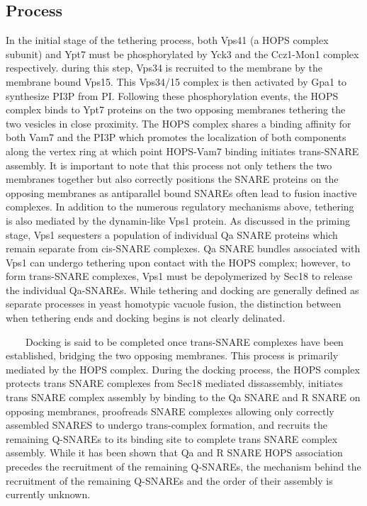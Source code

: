 \documentclass[12pt,twoside]{reedthesis}
\begin{document}
\subsection{Process}\label{process-1}

In the initial stage of the tethering process, both Vps41 (a HOPS complex subunit) and Ypt7 must be phosphorylated by Yck3 and the Ccz1-Mon1 complex respectively. during this step, Vps34 is recruited to the membrane by the membrane bound Vps15. This Vps34/15 complex is then activated by Gpa1 to synthesize PI3P from PI. Following these phosphorylation events, the HOPS complex binds to Ypt7 proteins on the two opposing membranes tethering the two vesicles in close proximity. The HOPS complex shares a binding affinity for both Vam7 and the PI3P which promotes the localization of both components along the vertex ring at which point HOPS-Vam7 binding initiates trans-SNARE assembly. It is important to note that this process not only tethers the two membranes together but also correctly positions the SNARE proteins on the opposing membranes as antiparallel bound SNAREs often lead to fusion inactive complexes. In addition to the numerous regulatory mechanisms above, tethering is also mediated by the dynamin-like Vps1 protein. As discussed in the priming stage, Vps1 sequesters a population of individual Qa SNARE proteins which remain separate from cis-SNARE complexes. Qa SNARE bundles associated with Vps1 can undergo tethering upon contact with the HOPS complex; however, to form trans-SNARE complexes, Vps1 must be depolymerized by Sec18 to release the individual Qa-SNAREs. While tethering and docking are generally defined as separate processes in yeast homotypic vacuole fusion, the distinction between when tethering ends and docking begins is not clearly delinated.\\
\strut ~~~~Docking is said to be completed once trans-SNARE complexes have been established, bridging the two opposing membranes. This process is primarily mediated by the HOPS complex. During the docking process, the HOPS complex protects trans SNARE complexes from Sec18 mediated dissassembly, initiates trans SNARE complex assembly by binding to the Qa SNARE and R SNARE on opposing membranes, proofreads SNARE complexes allowing only correctly assembled SNARES to undergo trans-complex formation, and recruits the remaining Q-SNAREs to its binding site to complete trans SNARE complex assembly. While it has been shown that Qa and R SNARE HOPS association precedes the recruitment of the remaining Q-SNAREs, the mechanism behind the recruitment of the remaining Q-SNAREs and the order of their assembly is currently unknown.
\end{document}
